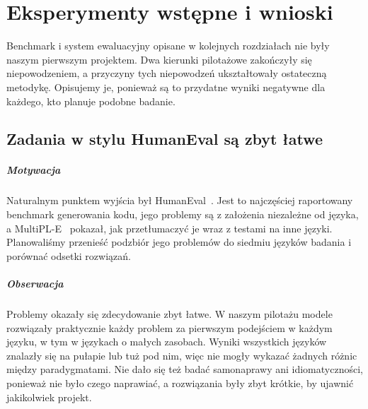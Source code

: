 \chapter{Eksperymenty wstępne i wnioski}
\label{ch:preliminary}

Benchmark i system ewaluacyjny opisane w kolejnych rozdziałach nie były naszym pierwszym projektem.
Dwa kierunki pilotażowe zakończyły się niepowodzeniem, a przyczyny tych niepowodzeń ukształtowały
ostateczną metodykę. Opisujemy je, ponieważ są to przydatne wyniki negatywne dla każdego, kto planuje
podobne badanie.

\section{Zadania w stylu HumanEval są zbyt łatwe}
\label{sec:humaneval}

\paragraph{Motywacja} Naturalnym punktem wyjścia był HumanEval~\cite{chen2021codex}. Jest to
najczęściej raportowany benchmark generowania kodu, jego problemy są z założenia niezależne od
języka, a MultiPL-E~\cite{cassano2023multiple} pokazał, jak przetłumaczyć je wraz z testami na inne
języki. Planowaliśmy przenieść podzbiór jego problemów do siedmiu języków badania i porównać odsetki
rozwiązań.

\paragraph{Obserwacja} Problemy okazały się zdecydowanie zbyt łatwe. W naszym pilotażu modele
rozwiązały praktycznie każdy problem za pierwszym podejściem w każdym języku, w tym w językach
o małych zasobach. Wyniki wszystkich języków znalazły się na pułapie lub tuż pod nim, więc nie mogły
wykazać żadnych różnic między paradygmatami. Nie dało się też badać samonaprawy ani
idiomatyczności, ponieważ nie było czego naprawiać, a rozwiązania były zbyt krótkie, by ujawnić
jakikolwiek projekt.

